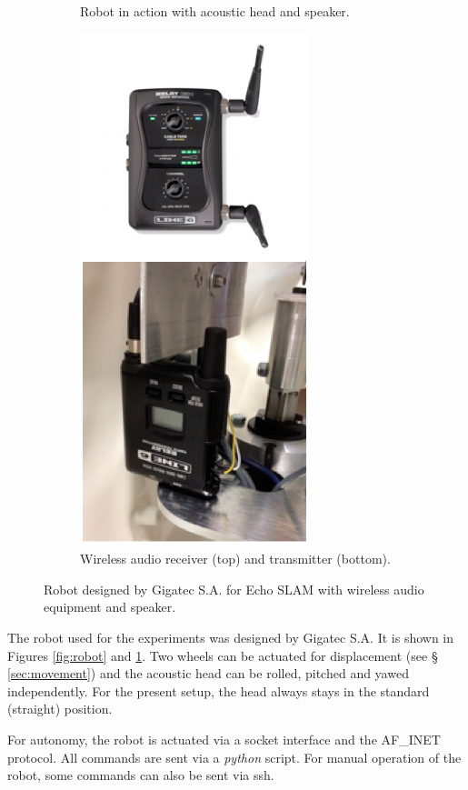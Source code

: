 \begin{figure}
\begin{subfigure}{0.3\linewidth}
        \caption{Robot in action with acoustic head and speaker.}
        \label{fig:robot_action}
    \end{subfigure}
    \hspace{0.5em}
    \begin{subfigure}{0.3\linewidth}
        \centering
        \includegraphics[height=0.3\textheight]{files/Wireless.png}
        \caption{Wireless audio receiver (top) and transmitter (bottom).}
        \label{fig:audio}
    \end{subfigure}
    \caption{Robot designed by Gigatec S.A. for Echo SLAM with wireless audio equipment and speaker.}
\end{figure}

The robot used for the experiments was designed by Gigatec S.A. It is shown in Figures \ref{fig:robot} and \ref{fig:robot_action}.
Two wheels can be actuated for displacement (see § \ref{sec:movement}) and the acoustic head can be rolled, pitched and yawed independently. 
For the present setup, the head always stays in the standard (straight) position.

For autonomy, the robot is actuated via a socket interface and the AF\_INET protocol. All commands are sent via a \textit{python} script. For manual operation of the robot, some commands can also be sent via ssh.
